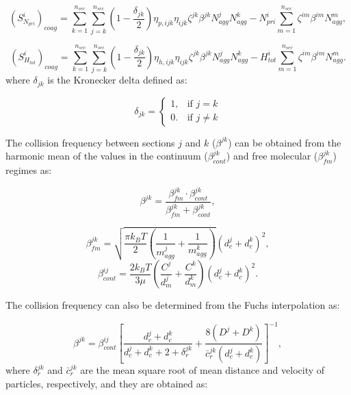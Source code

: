 \begin{equation}
	\left(S^i_{N_{pri}}\right)_{coag}
	=
	\sum_{k=1}^{n_{sec}}\sum_{j=k}^{n_{sec}}
	\left(
	1-\frac{\delta_{jk}}{2}
	\right)
	\eta_{p,ijk}\eta_{ijk}\zeta^{jk}\beta^{jk}N^j_{agg}N^k_{agg}
	-
	N^i_{pri}
	\sum_{m=1}^{n_{sec}}\zeta^{im}\beta^{im}N^m_{agg},
	\label{eqn:IcoagNprisect}
\end{equation}

\begin{equation}
	\left(S^i_{H_{tot}}\right)_{coag}
	=
	\sum_{k=1}^{n_{sec}}\sum_{j=k}^{n_{sec}}
	\left(
	1-\frac{\delta_{jk}}{2}
	\right)
	\eta_{h,ijk}\eta_{ijk}\zeta^{jk}\beta^{jk}N^j_{agg}N^k_{agg}
	-
	H^i_{tot}
	\sum_{m=1}^{n_{sec}}\zeta^{im}\beta^{im}N^m_{agg}.
	\label{eqn:IcoagHtotsect}
\end{equation}
\noindent where ${\delta_{jk}}$ is the Kronecker delta defined as:

\begin{equation}
	\delta_{jk}=
	\left\{
	\begin{array}{lr}
		1, & \text{if } j = k\\
		0. & \text{if } j \neq k
	\end{array}
	\right.
	\label{eqn:deltakronecker}
\end{equation}

The collision frequency between sections $j$ and $k$ ($\beta^{jk}$) can be obtained from the harmonic mean of the values in the continuum ($\beta_{cont}^{jk}$) and free molecular ($\beta_{fm}^{jk}$) regimes as:

\begin{equation}
	\beta^{jk} = 				       \frac{\beta^{jk}_{fm}\cdot\beta^{jk}_{cont}}{\beta^{jk}_{fm}
		+\beta^{jk}_{cont}}
	\label{eqn:betahmsect},
\end{equation}

\begin{equation}
	\beta^{jk}_{fm} =
	\sqrt{
		\frac{\pi k_B T}{2}
		\left(
		\frac{1}{m^j_{agg}}+
		\frac{1}{m^k_{agg}}
		\right)
	} 
	\left(
	d^j_c+d^k_c
	\right)^2
	\label{eqn:betafmsect},
\end{equation}
\begin{equation}
	\beta^{ij}_{cont} = \frac{2k_BT}{3\mu}
	\left(
	\frac{C^j}{d^j_m}+
	\frac{C^k}{d^k_m}
	\right)
	\left(
	d^j_c+d^k_c
	\right)^2
	\label{eqn:betacontsect}.
\end{equation}

The collision frequency can also be determined from the Fuchs interpolation as:

\begin{equation}
	\beta^{jk}=
	\beta^{ij}_{cont}
	\left[
	\frac{d^j_c+d^k_c}{d^j_c+d^k_c+2+\delta^{jk}_r}+
	\frac{8\left(D^j+D^k\right)}
	{\bar{c}^{jk}_r\left(d^j_c+d^k_c\right)}
	\right]^{-1},
	\label{eqn:betafuchssect}
\end{equation}
\noindent where ${\delta^{jk}_r}$ and ${\bar{c}^{jk}_r}$ are the mean square root of mean distance and velocity of particles, respectively, and they are obtained as:

